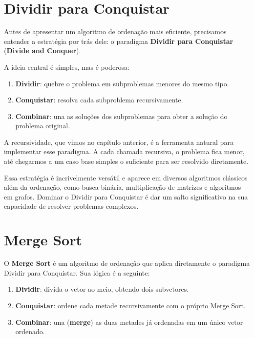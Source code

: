 \documentclass[12pt]{article}
\begin{document}

\section{Dividir para Conquistar}

Antes de apresentar um algoritmo de ordenação mais eficiente, precisamos entender a estratégia por trás dele: o paradigma \textbf{Dividir para Conquistar} (\textbf{Divide and Conquer}).

A ideia central é simples, mas é poderosa:
\begin{enumerate}
    \item \textbf{Dividir}: quebre o problema em subproblemas menores do mesmo tipo.
    \item \textbf{Conquistar}: resolva cada subproblema recursivamente.
    \item \textbf{Combinar}: una as soluções dos subproblemas para obter a solução do problema original.
\end{enumerate}

A recursividade, que vimos no capítulo anterior, é a ferramenta natural para implementar esse paradigma. A cada chamada recursiva, o problema fica menor, até chegarmos a um caso base simples o suficiente para ser resolvido diretamente.

Essa estratégia é incrivelmente versátil e aparece em diversos algoritmos clássicos além da ordenação, como busca binária, multiplicação de matrizes e algoritmos em grafos. Dominar o Dividir para Conquistar é dar um salto significativo na sua capacidade de resolver problemas complexos.


\section{Merge Sort}

O \textbf{Merge Sort} é um algoritmo de ordenação que aplica diretamente o paradigma Dividir para Conquistar. Sua lógica é a seguinte:

\begin{enumerate}
    \item \textbf{Dividir}: divida o vetor ao meio, obtendo dois subvetores.
    \item \textbf{Conquistar}: ordene cada metade recursivamente com o próprio Merge Sort.
    \item \textbf{Combinar}: una (\textbf{merge}) as duas metades já ordenadas em um único vetor ordenado.
\end{enumerate}
\end{document}
